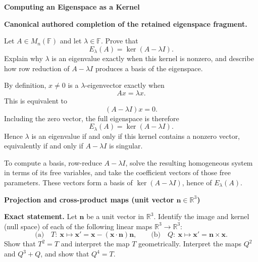 \begin{problem}[CP-I-0105]
\label{prob:cp-i-0105}
\textbf{Computing an Eigenspace as a Kernel}

\textbf{Canonical authored completion of the retained eigenspace fragment.}

\hspace*{1.5em}Let \(A\in M_n(\mathbb F)\) and let \(\lambda\in\mathbb F\).
Prove that
\[
E_\lambda(A)=\ker(A-\lambda I).
\]
Explain why \(\lambda\) is an eigenvalue exactly when this kernel is nonzero, and describe how
row reduction of \(A-\lambda I\) produces a basis of the eigenspace.
\end{problem}

\begin{solution}
By definition, \(x\neq0\) is a \(\lambda\)-eigenvector exactly when
\[
Ax=\lambda x.
\]
This is equivalent to
\[
(A-\lambda I)x=0.
\]
Including the zero vector, the full eigenspace is therefore
\[
E_\lambda(A)=\ker(A-\lambda I).
\]
Hence \(\lambda\) is an eigenvalue if and only if this kernel contains a nonzero vector, equivalently
if and only if \(A-\lambda I\) is singular.

To compute a basis, row-reduce \(A-\lambda I\), solve the resulting homogeneous system in
terms of its free variables, and take the coefficient vectors of those free parameters. These
vectors form a basis of \(\ker(A-\lambda I)\), hence of \(E_\lambda(A)\).
\end{solution}

\begin{problem}[CP-I-0119]
\label{prob:cp-i-0119}
\textbf{Projection and cross-product maps (unit vector $\mathbf n\in\mathbb R^3$)}

\textbf{Exact statement.}
\hspace*{1.5em}Let $\mathbf n$ be a unit vector in $\mathbb R^3$. Identify the image and kernel (null space) of each of the following linear maps $\mathbb R^3\to\mathbb R^3$:
\[
\text{(a)}\quad T:\ \mathbf x\mapsto \mathbf x'=\mathbf x-(\mathbf x\cdot\mathbf n)\mathbf n,
\qquad
\text{(b)}\quad Q:\ \mathbf x\mapsto \mathbf x'=\mathbf n\times \mathbf x.
\]
Show that $T^2=T$ and interpret the map $T$ geometrically. Interpret the maps $Q^2$ and $Q^3+Q$, and show that $Q^4=T$.

\end{problem}

